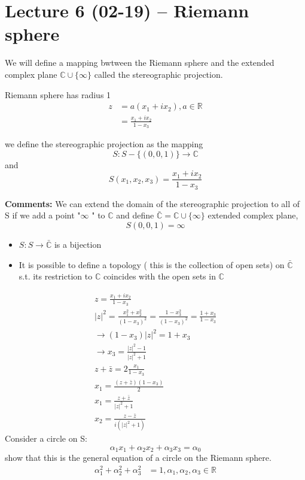 \section{Lecture 6 (02-19) -- {Riemann sphere}}
\begin{definition}{}
We will define a mapping bwtween the Riemann sphere and the extended complex plane $ \mathbb{C}\cup\{\infty\} $ called the stereographic projection.
\end{definition}
Riemann sphere has radius 1
\begin{align*}{}{}
z&=a(x_1+ix_2),a\in\mathbb{R}\\
&=\frac{x_1+ix_2}{1-x_3}
\end{align*}
\begin{definition}{}
we define the stereographic projection as the mapping$$
    S:S-\{(0,0,1)\}\rightarrow \mathbb{C}$$
    and $$
    S(x_1,x_2,x_3)=\frac{x_1+ix_2}{1-x_3}
    $$ 
\end{definition}
\textbf{Comments:}
We can extend the domain of the stereographic projection to all of S if we add a point "$ \infty $ " to $ \mathbb{C} $ and define $ \bar{\mathbb{C}}=\mathbb{C}\cup\{\infty\} $ extended complex plane,$$
    S(0,0,1)=\infty
$$   
\begin{itemize}
\item $ S:S\rightarrow\bar{\mathbb{C}} $ is a bijection 
\item It is possible to define a topology ( this is the collection of open sets) on $ \bar{\mathbb{C}} $ s.t. its restriction to $ \mathbb{C} $ coincides with the open sets in $ \mathbb{C} $
\end{itemize}
\begin{align*}{}{}
z=\frac{x_1+ix_2}{1-x_3}\\
|z|^2=\frac{x_1^2+x_2^2}{(1-x_3)^2}=\frac{1-x_3^2}{(1-x_3)^2}=\frac{1+x_3}{1-x_3}\\
\rightarrow (1-x_3)|z|^2=1+x_3\\
\rightarrow x_3=\frac{|z|^2-1}{|z|^2+1}\\
z+\bar{z}=2\frac{x_1}{1-x_3}\\
x_1=\frac{(z+\bar{z})(1-x_3)}{2}\\
x_1=\frac{z+\bar{z}}{|z|^2+1}\\
x_2=\frac{z-\bar{z}}{i(|z|^2+1)}
\end{align*}
Consider a circle on S:
$$
    \alpha_1x_1+\alpha_2x_2+\alpha_3x_3=\alpha_0 
$$ show that this is the general equation of a circle on the Riemann sphere.
\begin{align*}{}{}
\alpha_1^2+\alpha_2^2+\alpha_3^2&=1,\alpha_1,\alpha_2,\alpha_3\in\mathbb{R}\\
\end{align*}
